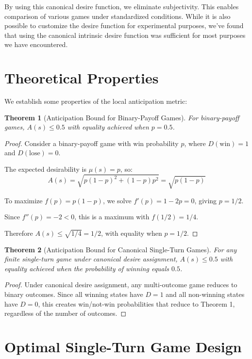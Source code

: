 \documentclass{article}
\newtheorem{theorem}{Theorem}
\begin{document}
By using this canonical desire function, we eliminate subjectivity.
This enables comparison of various games under standardized conditions.
While it is also possible to customize the desire function for experimental purposes, we've found that using the canonical intrinsic desire function was sufficient for most purposes we have encountered.

\section{Theoretical Properties}

We establish some properties of the local anticipation metric:

\begin{theorem}[Anticipation Bound for Binary-Payoff Games]
For binary-payoff games, $A(s) \leq 0.5$ with equality achieved when $p = 0.5$.
\end{theorem}

\begin{proof}
Consider a binary-payoff game with win probability $p$, where $D(\text{win}) = 1$ and $D(\text{lose}) = 0$.

The expected desirability is $\mu(s) = p$, so:
\[
A(s) = \sqrt{p(1-p)^2 + (1-p)p^2} = \sqrt{p(1-p)}
\]

To maximize $f(p) = p(1-p)$, we solve $f'(p) = 1-2p = 0$, giving $p = 1/2$.

Since $f''(p) = -2 < 0$, this is a maximum with $f(1/2) = 1/4$.

Therefore $A(s) \leq \sqrt{1/4} = 1/2$, with equality when $p = 1/2$.
\end{proof}

\begin{theorem}[Anticipation Bound for Canonical Single-Turn Games]
For any finite single-turn game under canonical desire assignment, $A(s) \leq 0.5$ with equality achieved when the probability of winning equals $0.5$.
\end{theorem}

\begin{proof}
Under canonical desire assignment, any multi-outcome game reduces to binary outcomes. Since all winning states have $D = 1$ and all non-winning states have $D = 0$, this creates win/not-win probabilities that reduce to Theorem 1, regardless of the number of outcomes.
\end{proof}

\section{Optimal Single-Turn Game Design}
\end{document}
